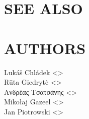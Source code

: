 \documentclass[a4paper,english]{article}
\begin{document}
\begin{adjustwidth}{18pt}{0pt}
  \section{SEE ALSO}

  \section{AUTHORS}
    Lukáš Chládek <>\\[0.1cm]\MANbr
    Rūta Giedrytė <>\\[0.1cm]\MANbr
    Ανδρέας Τσατσάνης <>\\[0.1cm]\MANbr
    Mikołaj Gazeel <>\\[0.1cm]\MANbr
    Jan Piotrowski <>
\end{adjustwidth}
\end{document}
